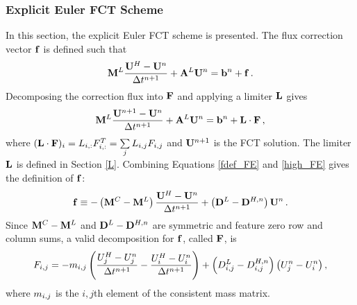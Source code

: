 \subsubsection{Explicit Euler FCT Scheme}
In this section, the explicit Euler FCT scheme is presented.
The flux correction vector $\mathbf{f}$ is defined such that
\begin{equation}\label{fdef_FE}
   \mathbf{M}^L\frac{\mathbf{U}^{H}-\mathbf{U}^n}{\Delta t^{n+1}} + \mathbf{A}^L\mathbf{U}^{n} = \mathbf{b}^n + \mathbf{f} \,.
\end{equation}
Decomposing the correction flux into $\mathbf{F}$ and applying a limiter $\mathbf{L}$ gives
\begin{equation}\label{limited_FE}
   \mathbf{M}^L\frac{\mathbf{U}^{n+1}-\mathbf{U}^n}{\Delta t^{n+1}} + \mathbf{A}^L\mathbf{U}^{n} = \mathbf{b}^n + \mathbf{L}\cdot\mathbf{F} \,,
\end{equation}
where $(\mathbf{L}\cdot\mathbf{F})_i = L_{i,:}F_{i,:}^T = \sum\limits_j L_{i,j} F_{i,j}$
and $\mathbf{U}^{n+1}$ is the FCT solution. The limiter $\mathbf{L}$ is
defined in Section \ref{L}.
Combining Equations \eqref{fdef_FE} and \eqref{high_FE}
gives the definition of $\mathbf{f}$:
\begin{equation}\label{f_FE}
   \mathbf{f} \equiv -\left(\mathbf{M}^C-\mathbf{M}^L\right)\frac{\mathbf{U}^H-\mathbf{U}^n}{\Delta t^{n+1}}
   + \left(\mathbf{D}^L-\mathbf{D}^{H,n}\right)\mathbf{U}^n \,.
\end{equation}
Since $\mathbf{M}^C-\mathbf{M}^L$ and $\mathbf{D}^L-\mathbf{D}^{H,n}$ are symmetric
and feature zero row and column sums, a valid decomposition for $\mathbf{f}$,
called $\mathbf{F}$, is
\begin{equation}
   F_{i,j} = -m_{i,j}\left(\frac{U_j^H - U_j^n}{\Delta t^{n+1}}
   - \frac{U_i^H - U_i^n}{\Delta t^{n+1}}\right)
   + \left(D_{i,j}^L-D_{i,j}^{H,n}\right)\left(U_j^n - U_i^n\right),
\end{equation}
where $m_{i,j}$ is the $i,j$th element of the consistent mass matrix.
